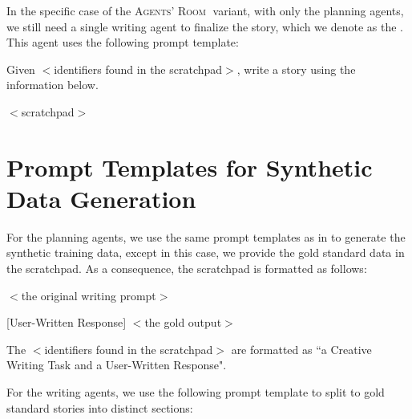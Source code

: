 \documentclass{article}
\newcommand{\Agentsroom}{\textsc{Agents' Room}}
\begin{document}
        
In the specific case of the \Agentsroom$\;${\sc [planning]} variant, with only the planning agents, we still need a single writing agent to finalize the story, which we denote as the {\sc [finalizer]}. This {\sc [finalizer]} agent uses the following prompt template: 

\begin{tcolorbox}[colback=white, colframe=my-red, coltitle=black, parskip=5mm, title=
\textbf{\textsc{[Finalizer]} Agent Prompt}, breakable, halign=flush left]
Given 
$<$identifiers found in the scratchpad$>$,
         write a story using the information below.
         
\medskip
$<$scratchpad$>$
\end{tcolorbox}

\section{Prompt Templates for Synthetic Data Generation}
\label{appendix:synthetic_data_generation}

For the planning agents, we use the same prompt templates as in  to generate the synthetic training data, except in this case, we provide the gold standard data in the scratchpad. As a consequence, the scratchpad is formatted as follows: 

\begin{tcolorbox}
$<$the original writing prompt$>$
\bigskip

[User-Written Response]
$<$the gold output$>$
\end{tcolorbox}

The $<$identifiers found in the scratchpad$>$ are formatted as “a Creative Writing Task and a User-Written Response".

For the writing agents, we use the following prompt template to split to gold standard stories into distinct sections: 
\end{document}

